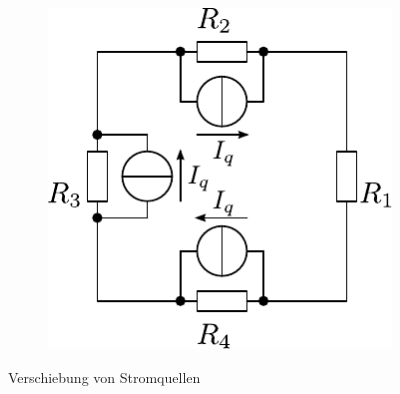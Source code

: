 \begin{figure}[h!]
\begin{subfigure}[b]{0.3\textwidth}
		\label{sch:qversch_iq2}
	\end{subfigure}
	\begin{subfigure}[b]{0.3\textwidth}
		\centering
		\includegraphics[scale=\schscalesmall]{qversch_iq3_sch.pdf}
		\label{sch:qversch_iq3}
	\end{subfigure}
	\caption{Verschiebung von Stromquellen}
	\label{sch:qversch_iq}
\end{figure}
